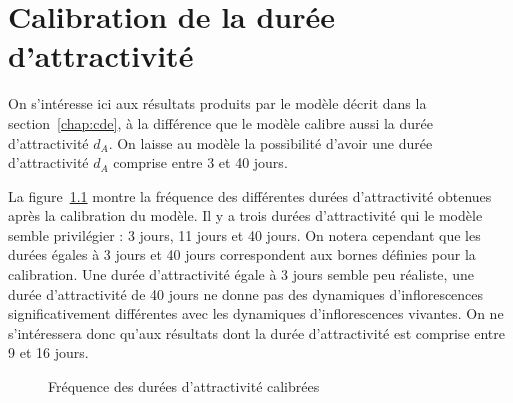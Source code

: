 \chapter{Calibration de la durée d'attractivité} 
\label{chap:attra}

On s'intéresse ici aux résultats produits par le modèle décrit dans la section~\ref{chap:cde}, à la différence que le modèle calibre aussi la durée d'attractivité $d_A$.
On laisse au modèle la possibilité d'avoir une durée d'attractivité $d_A$ comprise entre 3 et 40 jours.

La figure~\ref{fig:da} montre la fréquence des différentes durées d'attractivité obtenues après la calibration du modèle.
Il y a trois durées d'attractivité qui le modèle semble privilégier : 3 jours, 11 jours et 40 jours.
On notera cependant que les durées égales à 3 jours et 40 jours correspondent aux bornes définies pour la calibration.
Une durée d'attractivité égale à 3 jours semble peu réaliste, une durée d'attractivité de 40 jours ne donne pas des dynamiques d'inflorescences significativement différentes avec les dynamiques d'inflorescences vivantes.
On ne s'intéressera donc qu'aux résultats dont la durée d'attractivité est comprise entre 9 et 16 jours.

\begin{figure}[ht]
 \centering
 \caption{Fréquence des durées d'attractivité calibrées}
 \label{fig:da}
\end{figure}


